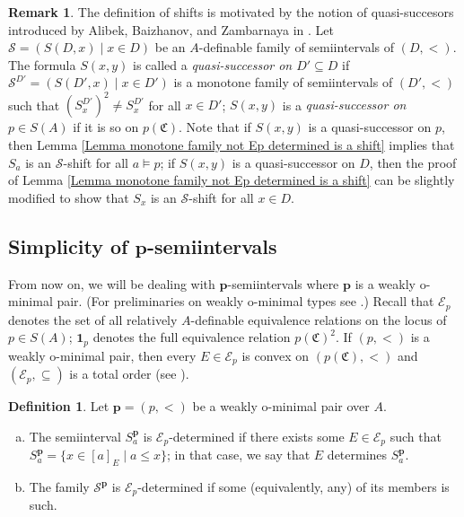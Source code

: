 \documentclass{amsart}
\theoremstyle{definition}
\theoremstyle{definition}
\newtheorem{Definition}[Theorem]{Definition}
\newtheorem{Remark}[Theorem]{Remark}
\newcommand{\Mon}{\mathfrak C}
\begin{document}
\begin{Remark} The definition of shifts is motivated by the notion of quasi-succesors introduced by Alibek, Baizhanov, and Zambarnaya in  \cite{Alibek}. 
Let $\mathcal S=(S(D,x)\mid x\in D)$ be an $A$-definable family of semiintervals of $(D,<)$. The formula $S(x,y)$ is called a {\it quasi-successor on $D'\subseteq D$}
if $\mathcal S^{D'}=(S(D',x)\mid x\in D')$ is a monotone family of semiintervals of $(D',<)$ such that $(S^{D'}_x)^2\neq S^{D'}_x$ for all $x\in D'$; $S(x,y)$ is a {\it quasi-successor on $p\in S(A)$} if it is so on $p(\Mon)$. 
Note that if $S(x,y)$ is a quasi-successor on $p$, then Lemma \ref{Lemma monotone family not Ep determined is a shift} implies that $S_a$ is an $\mathcal S$-shift for all $a\models p$; if $S(x,y)$ is a quasi-successor on $D$, then the proof of Lemma \ref{Lemma monotone family not Ep determined is a shift} can be slightly modified to show that $S_x$ is an $\mathcal S$-shift for all $x\in D$. 
\end{Remark} 

\subsection{Simplicity of $\mathbf p$-semiintervals}

From now on, we will be dealing with $\mathbf p$-semiintervals where $\mathbf p$ is a weakly o-minimal pair. (For preliminaries on weakly o-minimal types see \cite[Subsection 2.2]{MTwqom1}.)
Recall that $\mathcal E_p$ denotes the set of all relatively $A$-definable equivalence relations on the locus of $p\in S(A)$; $\mathbf 1_p$ denotes the full equivalence relation $p(\Mon)^2$. If $(p,<)$ is a weakly o-minimal pair, then every $E\in \mathcal E_p$ is convex on $(p(\Mon),<)$ and $(\mathcal E_p, \subseteq)$ is a total order (see \cite[Lemma 3.6 and Proposition 3.10]{MTwom}).




\begin{Definition}\label{Definition_Ep_determined}
Let $\mathbf p=(p,<)$ be a weakly o-minimal pair over $A$.
\begin{enumerate}[(a)]
\item The semiinterval $S^{\mathbf p}_a$ is $\mathcal E_p$-determined if there exists some $E\in\mathcal E_p$ such that $S^{\mathbf p}_a=\{x\in [a]_E\mid a\leqslant x\}$; in that case, we say that $E$ determines $S^{\mathbf p}_a$.
\item The family $\mathcal S^{\mathbf p}$ is $\mathcal E_p$-determined if some (equivalently, any) of its members is such.
\end{enumerate}
\end{Definition}
\end{document}
